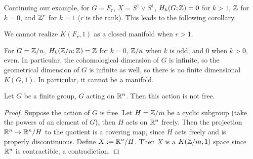 \begin{example}
    Continuing our example, for $G=F_r$, $X=S^1 \vee S^1 $, $H_k(G;\mathbb{Z})=0$ for $k>1$, $\mathbb{Z}$ for $k=0$, and $\mathbb{Z}^r $ for $k=1$ ($r$ is the rank). This leads to the following corollary.
\end{example}
\begin{cor}
    We cannot realize $K(F_r,1)$ as a closed manifold when $r>1$.
\end{cor}
For $G=\mathbb{Z} /n$, $H_k(\mathbb{Z} /n;\mathbb{Z})=\mathbb{Z}$ for $k=0$, $\mathbb{Z} /n$ when $k$ is odd, and $0$ when $k>0 $, even. In particular, the cohomological dimension of $G$ is infinite, so the geometrical dimension of $G$ is infinite as well, so there is no finite dimensional $K(G,1)$. In particular, it cannot be a manifold.
\begin{prop}
    Let $G$ be a finite group, $G$ acting on $\mathbb{R}^n $. Then this action is not free.
\end{prop}
\begin{proof}
    Suppose the action of $G$ is free. Let $H=\mathbb{Z} /m$ be a cyclic subgroup (take the powers of an element of $G$), then $H$ acts on $\mathbb{R}^n $ freely. Then the projection $\mathbb{R}^n  \to \mathbb{R}^n  /H$ to the quotient is a covering map, since $H$ acts freely and is properly discontinuous. Define $X:= \mathbb{R}^n  /H$. Then $X$ is a $K(\mathbb{Z} /m,1)$ space since $\mathbb{R}^n $ is contractible, a contradiction.
\end{proof}
